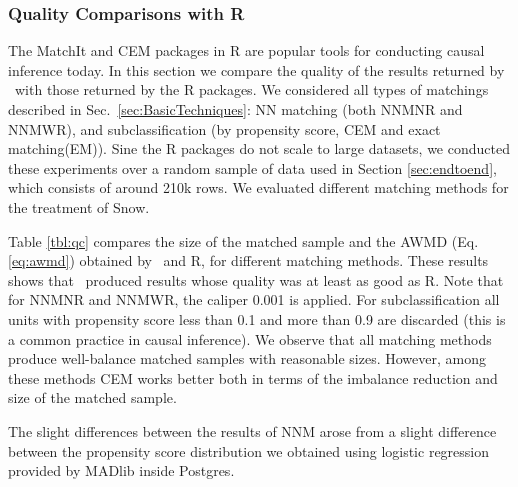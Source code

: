 \vspace{-.3cm}
\subsubsection{Quality Comparisons with R}



The MatchIt and CEM packages in R are popular tools for conducting
causal inference today.  In this section we compare the quality of the
results returned by \GSQL\ with those returned by the R packages.  We
considered all types of matchings described in
Sec.~\ref{sec:BasicTechniques}: NN matching (both NNMNR and NNMWR),
and subclassification (by propensity score, CEM and exact matching(EM)).  Sine the R
packages do not scale to large datasets, we conducted these
experiments over a random sample of data used in Section
\ref{sec:endtoend}, which consists of around 210k rows. We evaluated
different matching methods for the treatment of Snow.


Table \ref{tbl:qc} compares the size of the matched sample and the
AWMD (Eq.\ref{eq:awmd}) obtained by \GSQL \ and R, for different
matching methods.  These results shows that \GSQL\ produced results
whose quality was at least as good as R.  Note that for NNMNR and
NNMWR, the caliper 0.001 is applied.   For subclassification all units with
propensity score less than 0.1 and more than 0.9 are discarded (this
is a common practice in causal inference). We observe that all
matching methods produce well-balance matched samples with reasonable
sizes. However, among these methods CEM works better both in terms of
the imbalance reduction and size of the matched sample.

The slight differences between
the results of NNM arose from a slight
difference between the propensity score distribution we obtained using logistic regression provided by MADlib inside Postgres. 








